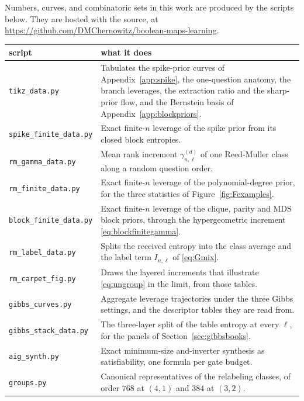\documentclass[11pt]{article}
\begin{document}
Numbers, curves, and combinatoric sets in this work are produced by the scripts
below. They are hosted with the source, at
\url{https://github.com/DMChernowitz/boolean-maps-learning}.


\begin{table}[H]
\begin{center}
\small
\begin{tabular}{@{}l p{10.3cm}@{}}
\toprule
script & what it does \\
\midrule
\texttt{tikz\_data.py} & Tabulates the spike-prior curves of
  Appendix~\ref{app:spike}, the one-question anatomy, the branch leverages,
  the extraction ratio and the sharp-prior flow, and the Bernstein basis of
  Appendix~\ref{app:blockpriors}. \\
\texttt{spike\_finite\_data.py} & Exact finite-$n$ leverage of the spike
  prior from its closed block entropies. \\
\texttt{rm\_gamma\_data.py} & Mean rank increment
  $\gamma^{(d)}_{n,\ell}$ of one Reed-Muller class along a random question
  order. \\
\texttt{rm\_finite\_data.py} & Exact finite-$n$ leverage of the
  polynomial-degree prior, for the three statistics of
  Figure~\ref{fig:Fexamples}. \\
\texttt{block\_finite\_data.py} & Exact finite-$n$ leverage of the clique,
  parity and MDS block priors, through the hypergeometric increment
  \eqref{eq:blockfinitegamma}. \\
\addlinespace[5pt]
\texttt{rm\_label\_data.py} & Splits the received entropy into the class
  average and the label term $I_{n,\ell}$ of \eqref{eq:Gmix}. \\
\texttt{rm\_carpet\_fig.py} & Draws the layered increments that
  illustrate \eqref{eq:ungroup} in the limit, from those tables. \\
\texttt{gibbs\_curves.py} & Aggregate leverage trajectories under the three
  Gibbs settings, and the descriptor tables they are read from. \\
\texttt{gibbs\_stack\_data.py} & The three-layer split of the table entropy
  at every $\ell$, for the panels of Section~\ref{sec:gibbsbooks}. \\
\addlinespace[5pt]
\texttt{aig\_synth.py} & Exact minimum-size and-inverter synthesis as
  satisfiability, one formula per gate budget. \\
\texttt{groups.py} & Canonical representatives of the relabeling classes,
  of order $768$ at $(4,1)$ and $384$ at $(3,2)$. \\

\end{tabular}
\end{center}
\end{table}
\end{document}

